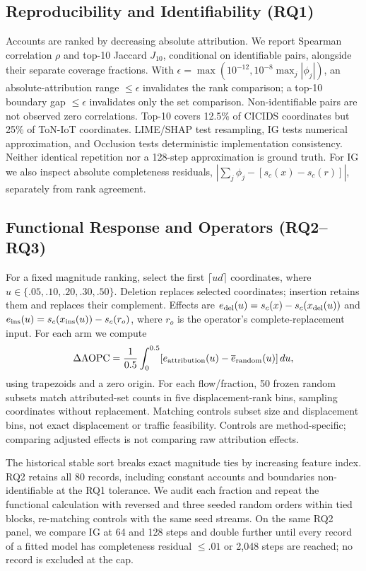 \subsection{Reproducibility and Identifiability (RQ1)}

Accounts are ranked by decreasing absolute attribution. We report Spearman
correlation $\rho$ and top-10 Jaccard $J_{10}$, conditional on identifiable
pairs, alongside their separate coverage fractions. With
$\epsilon=\max(10^{-12},10^{-8}\max_j|\phi_j|)$, an absolute-attribution range
$\leq\epsilon$ invalidates the rank comparison; a top-10 boundary gap
$\leq\epsilon$ invalidates only the set comparison. Non-identifiable pairs
are not observed zero correlations. Top-10 covers 12.5\% of CICIDS coordinates
but 25\% of ToN-IoT coordinates. LIME/SHAP test resampling, IG tests numerical
approximation, and Occlusion tests deterministic implementation consistency.
Neither identical repetition nor a 128-step approximation is ground truth.
For IG we also inspect absolute completeness residuals,
$|\sum_j\phi_j-[s_c(x)-s_c(r)]|$, separately from rank agreement.

\subsection{Functional Response and Operators (RQ2--RQ3)}

For a fixed magnitude ranking, select the first $\lceil ud\rceil$ coordinates,
where $u\in\{.05,.10,.20,.30,.50\}$. Deletion replaces selected coordinates;
insertion retains them and replaces their complement. Effects are
$e_{\rm del}(u)=s_c(x)-s_c(x_{\rm del}(u))$ and
$e_{\rm ins}(u)=s_c(x_{\rm ins}(u))-s_c(r_o)$, where $r_o$ is the operator's
complete-replacement input. For each arm we compute
\begin{equation}
\Delta\mathrm{AOPC}=\frac{1}{0.5}\int_0^{0.5}
  [e_{\rm attribution}(u)-\overline e_{\rm random}(u)]\,du,
\label{eq:aopc}
\end{equation}
using trapezoids and a zero origin. For each flow/fraction, 50 frozen random
subsets match attributed-set counts in five displacement-rank bins, sampling
coordinates without replacement. Matching controls subset size and displacement
bins, not exact displacement or traffic feasibility. Controls are method-specific;
comparing adjusted effects is not comparing raw attribution effects.

The historical stable sort breaks exact magnitude ties by increasing feature
index. RQ2 retains all 80 records, including constant accounts and boundaries
non-identifiable at the RQ1 tolerance. We audit each fraction and repeat the
functional calculation with reversed and three seeded random orders within
tied blocks, re-matching controls with the same seed streams.
On the same RQ2 panel, we compare IG at 64 and 128 steps and double further
until every record of a fitted model has completeness residual $\leq .01$
or 2,048 steps are reached; no record is excluded at the cap.

